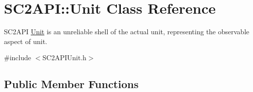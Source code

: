 \hypertarget{class_s_c2_a_p_i_1_1_unit}{}\section{S\+C2\+A\+PI\+:\+:Unit Class Reference}
\label{class_s_c2_a_p_i_1_1_unit}


S\+C2\+A\+PI \hyperlink{class_s_c2_a_p_i_1_1_unit}{Unit} is an unreliable shell of the actual unit, representing the observable aspect of unit.  




{\ttfamily \#include $<$S\+C2\+A\+P\+I\+Unit.\+h$>$}

\subsection*{Public Member Functions}
